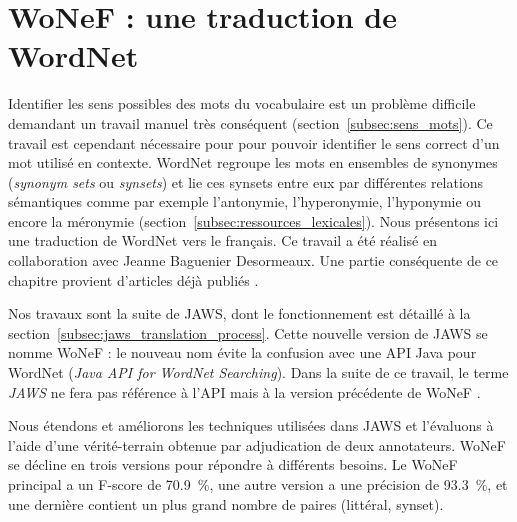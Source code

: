 

\chapter{WoNeF : une traduction de WordNet}
\label{ch:wonef} 

Identifier les sens possibles des mots du vocabulaire est un problème difficile
demandant un travail manuel très conséquent (section~\ref{subsec:sens_mots}).
Ce travail est cependant nécessaire pour pour pouvoir identifier le sens
correct d'un mot utilisé en contexte. WordNet \citep{fellbaum1998wordnet}
regroupe les mots en ensembles de synonymes (\textit{synonym sets} ou
\textit{synsets}) et lie ces synsets entre eux par différentes relations
sémantiques comme par exemple l'antonymie, l'hyperonymie, l'hyponymie ou encore
la méronymie (section~\ref{subsec:ressources_lexicales}). Nous présentons ici
une traduction de WordNet vers le français. Ce travail a été réalisé en
collaboration avec Jeanne Baguenier Desormeaux. Une partie conséquente de ce
chapitre provient d'articles déjà publiés
\citep{pradet2013wonef,pradet2014wonef}.

Nos travaux sont la suite de JAWS, dont le fonctionnement est détaillé à la
section~\ref{subsec:jaws_translation_process}. Cette nouvelle version de JAWS
se nomme WoNeF : le nouveau nom évite la confusion avec une API Java pour
WordNet (\textit{Java API for WordNet Searching}). Dans la suite de ce travail,
le terme \textit{JAWS} ne fera pas référence à l'API mais à la version précédente
de WoNeF \citep{mouton2010jaws,mouton2010phd}.

Nous étendons et améliorons les techniques utilisées dans JAWS et l'évaluons à
l'aide d'une vérité-terrain obtenue par adjudication de deux annotateurs. WoNeF
se décline en trois versions pour répondre à différents besoins. Le WoNeF
principal a un F-score de 70.9~\%, une autre version a une précision de
93.3~\%, et une dernière contient un plus grand nombre de paires (littéral, synset).

